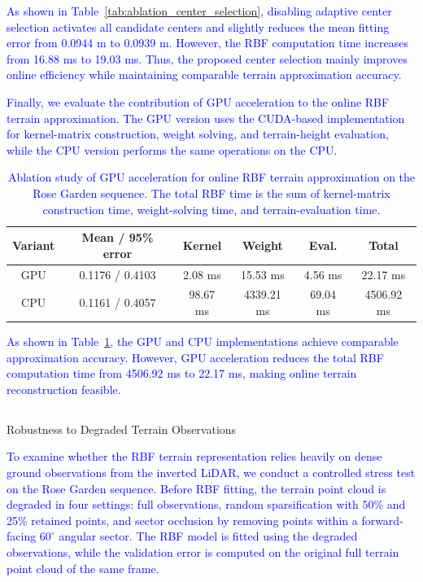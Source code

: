 \documentclass[journal,twoside,web]{ieeecolor}
\makeatletter
\newcommand{\cs}[1]{\textcolor{blue}{#1}}
\let\origsubsection\subsection
\def\subsection{\@ifstar\subsectionstarcolor\subsectioncolorcmd}
\def\subsectioncolorcmd#1{\origsubsection{\textcolor{subsectioncolor}{#1}}}
\def\subsectionstarcolor#1{\origsubsection*{#1}}
\makeatother
\begin{document}
\cs{As shown in Table~\ref{tab:ablation_center_selection}, disabling adaptive center selection activates all candidate centers and slightly reduces the mean fitting error from 0.0944 m to 0.0939 m. However, the RBF computation time increases from 16.88 ms to 19.03 ms. Thus, the proposed center selection mainly improves online efficiency while maintaining comparable terrain approximation accuracy.}

\cs{Finally, we evaluate the contribution of GPU acceleration to the online RBF terrain approximation. The GPU version uses the CUDA-based implementation for kernel-matrix construction, weight solving, and terrain-height evaluation, while the CPU version performs the same operations on the CPU.}

\begin{table}[!t]
\centering
\caption{\cs{Ablation study of GPU acceleration for online RBF terrain approximation on the Rose Garden sequence. The total RBF time is the sum of kernel-matrix construction time, weight-solving time, and terrain-evaluation time.}}
\label{tab:ablation_gpu_acceleration}
\footnotesize
\renewcommand{\arraystretch}{1.15}
\setlength{\tabcolsep}{1.8pt}
\begin{tabular}{|c|c|c|c|c|c|}
\hline
Variant & Mean / 95\% error & Kernel & Weight & Eval. & Total \\
\hline
GPU & 0.1176 / 0.4103 & 2.08 ms & 15.53 ms & 4.56 ms & 22.17 ms \\

CPU & 0.1161 / 0.4057 & 98.67 ms & 4339.21 ms & 69.04 ms & 4506.92 ms \\
\hline
\end{tabular}
\renewcommand{\arraystretch}{1.0}
\end{table}

\cs{As shown in Table~\ref{tab:ablation_gpu_acceleration}, the GPU and CPU implementations achieve comparable approximation accuracy. However, GPU acceleration reduces the total RBF computation time from 4506.92 ms to 22.17 ms, making online terrain reconstruction feasible.}

\subsection{Robustness to Degraded Terrain Observations}
\label{subsec:terrain_observation_stress}

\cs{To examine whether the RBF terrain representation relies heavily on dense ground observations from the inverted LiDAR, we conduct a controlled stress test on the Rose Garden sequence. Before RBF fitting, the terrain point cloud is degraded in four settings: full observations, random sparsification with 50\% and 25\% retained points, and sector occlusion by removing points within a forward-facing $60^{\circ}$ angular sector. The RBF model is fitted using the degraded observations, while the validation error is computed on the original full terrain point cloud of the same frame.}
\end{document}
